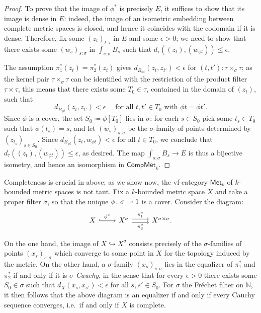 \begin{proof}
    To prove that the image of $\phi^*$ is precisely $E$, it suffices to show that its image is dense in $E$: indeed, the image of an isometric embedding between complete metric spaces is closed, and hence it coincides with the codomain if it is dense.
    Therefore, fix some $(z_t)_{t:\tau}$ in $E$ and some $\epsilon > 0$; we need to show that there exists some $(w_s)_{s:\sigma}$ in $\int_{s:\sigma}B_s$ such that $d_\tau ((z_t), (w_{\phi t})) \leq \epsilon$.
    
    The assumption $\pi_1^*(z_t) = \pi_2^*(z_t)$ gives $d_{B_{\phi t}}(z_t, z_{t'}) < \epsilon$ for $(t,t') : \tau\times_\sigma \tau$; as the kernel pair
    $\tau\times_\sigma\tau$ can be identified with the restriction of the product filter $\tau\times\tau$,
    this means that there exists some $T_0\in\tau$, contained in the domain of $(z_t)$, such that
    \[d_{B_{\phi t}}(z_t,z_{t'}) < \epsilon \quad \text{ for all } t,t'\in T_0 \text{ with } \phi t = \phi t'.\]
    Since $\phi$ is a cover, the set $S_0\coloneqq\phi[T_0]$ lies in $\sigma$: for each $s\in S_0$ pick some $t_s \in T_0$ such that $\phi(t_s) = s$, and let $(w_s)_{s:\sigma}$ be the $\sigma$-family of points determined by $(z_{t_s})_{s\in S_0}$. Since $d_{B_{\phi t}}(z_t, w_{\phi t}) < \epsilon$ for all $t \in T_0$, we conclude that $d_\tau ((z_t), (w_{\phi t})) \leq \epsilon$, as desired.
    The map $\int_{s:\sigma}B_s\to E$ is thus a bijective isometry, and hence an isomorphism in $\mathsf{CompMet}_k$.
\end{proof}

\begin{rmk}\label{rmk:metk-is-not-taut}
    Completeness is crucial in  above; as we show now, the vf-category $\mathsf{Met}_k$ of $k$-bounded metric spaces is not taut. Fix a $k$-bounded metric space $X$ and take a proper filter $\sigma$, so that the unique $\phi\colon\sigma\twoheadrightarrow1$ is a cover. Consider the diagram:
    \[\begin{tikzcd}
    	X & {X^\sigma} & {X^{\sigma\times \sigma}.}
    	\arrow["{\phi^*}", hook, from=1-1, to=1-2]
    	\arrow["{\pi_1^*}", shift left, from=1-2, to=1-3]
    	\arrow["{\pi_2^*}"', shift right, from=1-2, to=1-3]
    \end{tikzcd}\]

    On the one hand, the image of $X \hookrightarrow X^\sigma$ consists precisely of the $\sigma$-families of points $(x_s)_{s:\sigma}$ which converge to some point in $X$ for the topology induced by the metric. On the other hand, a $\sigma$-family $(x_s)_{s:\sigma}$ lies in the equalizer of $\pi_1^*$ and $\pi_2^*$ if and only if it is \emph{$\sigma$-Cauchy}, in the sense that for every $\epsilon >0$ there exists some $S_0 \in \sigma$ such that $d_X(x_s,x_{s'}) < \epsilon$ for all $s,s' \in S_0$. 
    For $\sigma$ the Fréchet filter on $\mathbb N$, it then follows that the above diagram is an equalizer if and only if every Cauchy sequence converges, i.e.\ if and only if $X$ is complete.
\end{rmk}

